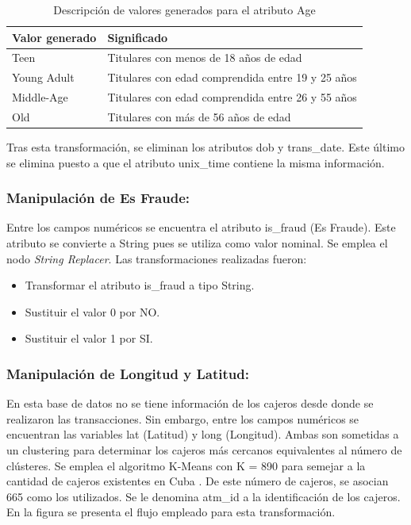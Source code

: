 \begin{table} [H]
	\centering
	\begin{tabular}{l l}
		\toprule
		\textbf{Valor generado} & \textbf{Significado} \\
		\midrule
		Teen & Titulares con menos de 18 años de edad \\
		\addlinespace
		Young Adult & Titulares con edad comprendida entre 19 y 25 años \\
		\addlinespace
		Middle-Age & Titulares con edad comprendida entre 26 y 55 años \\ 
		\addlinespace
		Old & Titulares con más de 56 años de edad \\ 
		\bottomrule
	\end{tabular}
	\caption{Descripción de valores generados para el atributo \textsf{Age}}
	\label{tabla:atributo-age}
\end{table}

Tras esta transformación, se eliminan los atributos \textsf{dob} y \textsf{trans\_date}. Este último se elimina puesto a que el atributo \textsf{unix\_time} contiene la misma información.


\subsubsection{Manipulación de Es Fraude:}
Entre los campos numéricos se encuentra el atributo \textsf{is\_fraud} (Es Fraude). Este atributo se convierte a String pues se utiliza como valor nominal. Se emplea el nodo \textit{String Replacer}.
Las transformaciones realizadas fueron:
\begin{itemize}
	\item Transformar el atributo \textsf{is\_fraud} a tipo String.
	\item Sustituir el valor 0 por NO.
	\item Sustituir el valor 1 por SI.
\end{itemize}

\subsubsection{Manipulación de Longitud y Latitud:}
En esta base de datos no se tiene información de los cajeros desde donde se realizaron las transacciones. Sin embargo, entre los campos numéricos se encuentran las variables \textsf{lat} (Latitud) y \textsf{long} (Longitud). Ambas son sometidas a un clustering para determinar los cajeros más cercanos equivalentes al número de clústeres. Se emplea el algoritmo K-Means con K = 890 para semejar a la cantidad de cajeros existentes en Cuba \citep{Hernandez2021}. De este número de cajeros, se asocian 665 como los utilizados. Se le denomina \textsf{atm\_id} a la identificación de los cajeros. En la figura  se presenta el flujo empleado para esta transformación.


